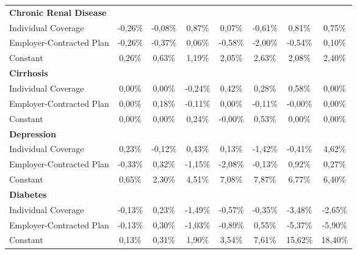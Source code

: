 \documentclass{article}
\begin{document}
\begin{table*}
{\begin{tabular}{l*{7}{c}}
\midrule
\textbf{Chronic Renal Disease} & & & & & & & \\

Individual Coverage      &  -0,26\%         &  -0,08\%         &   0,87\%         &   0,07\%         &  -0,61\%         &   0,81\%         &   0,75\%         \\
Employer-Contracted Plan &  -0,26\%         &  -0,37\%         &   0,06\%         &  -0,58\%         &  -2,00\%\sym{*}  &  -0,54\%         &   0,10\%         \\
Constant                 &   0,26\%         &   0,63\%\sym{*}  &   1,19\%         &   2,05\%\sym{**} &   2,63\%\sym{**} &   2,08\%\sym{*}  &   2,40\%         \\

\midrule
\textbf{Cirrhosis} & & & & & & & \\

Individual Coverage      &   0,00\%         &   0,00\%         &  -0,24\%         &   0,42\%         &   0,28\%         &   0,58\%         &   0,00\%         \\
Employer-Contracted Plan &   0,00\%         &   0,18\%         &  -0,11\%         &   0,00\%         &  -0,11\%         &  -0,00\%         &   0,00\%         \\
Constant                 &   0,00\%         &   0,00\%         &   0,24\%         &  -0,00\%         &   0,53\%         &   0,00\%         &   0,00\%         \\

\midrule
\textbf{Depression} & & & & & & & \\

Individual Coverage      &   0,23\%         &  -0,12\%         &   0,43\%         &   0,13\%         &  -1,42\%         &  -0,41\%         &   4,62\%         \\
Employer-Contracted Plan &  -0,33\%         &   0,32\%         &  -1,15\%         &  -2,08\%         &  -0,13\%         &   0,92\%         &   0,27\%         \\
Constant                 &   0,65\%\sym{*}  &   2,30\%\sym{***}&   4,51\%\sym{***}&   7,08\%\sym{***}&   7,87\%\sym{***}&   6,77\%\sym{***}&   6,40\%\sym{**} \\

\midrule
\textbf{Diabetes} & & & & & & & \\

Individual Coverage      &  -0,13\%         &   0,23\%         &  -1,49\%         &  -0,57\%         &  -0,35\%         &  -3,48\%         &  -2,65\%         \\
Employer-Contracted Plan &  -0,13\%         &   0,30\%         &  -1,03\%         &  -0,89\%         &   0,55\%         &  -5,37\%         &  -5,90\%         \\
Constant                 &   0,13\%         &   0,31\%         &   1,90\%\sym{**} &   3,54\%\sym{***}&   7,61\%\sym{***}&  15,62\%\sym{***}&  18,40\%\sym{***}\\


\end{tabular}}
\end{table*}
\end{document}
